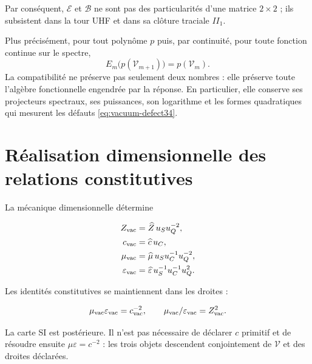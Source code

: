 Par conséquent, \(\mathcal E\) et \(\mathcal B\) ne sont pas des particularités d'une matrice \(2\times2\) ; ils subsistent dans la tour UHF et dans sa clôture traciale \(II_1\).

Plus précisément, pour tout polynôme \(p\) puis, par continuité,
pour toute fonction continue sur le spectre,
\begin{equation}
E_m\bigl(p(\mathcal V_{m+1})\bigr)=p(\mathcal V_m).
\label{eq:vacuum-functional-refinement}
\end{equation}
La compatibilité ne préserve pas seulement deux nombres : elle préserve toute
l'algèbre fonctionnelle engendrée par la réponse. En particulier, elle conserve ses
projecteurs spectraux, ses puissances, son logarithme et les formes quadratiques
qui mesurent les défauts \cref{eq:vacuum-defect34}.

\section{Réalisation dimensionnelle des relations constitutives}

La mécanique dimensionnelle détermine

\begin{align}
Z_{\rm vac}&=\widehat Z\,u_Su_Q^{-2},\\
c_{\rm vac}&=\widehat c\,u_C,\\
\mu_{\rm vac}&=\widehat\mu\,u_Su_C^{-1}u_Q^{-2},\\
\varepsilon_{\rm vac}&=\widehat\varepsilon\,u_S^{-1}u_C^{-1}u_Q^2.
\label{eq:vacuum-sections}
\end{align}

Les identités constitutives se maintiennent dans les droites :

\begin{equation}
\mu_{\rm vac}\varepsilon_{\rm vac}=c_{\rm vac}^{-2},
\qquad
\mu_{\rm vac}/\varepsilon_{\rm vac}=Z_{\rm vac}^2.
\end{equation}

La carte SI est postérieure. Il n'est pas nécessaire de déclarer \(c\) primitif et de résoudre ensuite \(\mu\varepsilon=c^{-2}\) : les trois objets descendent conjointement de \(\mathcal V\) et des droites déclarées.


